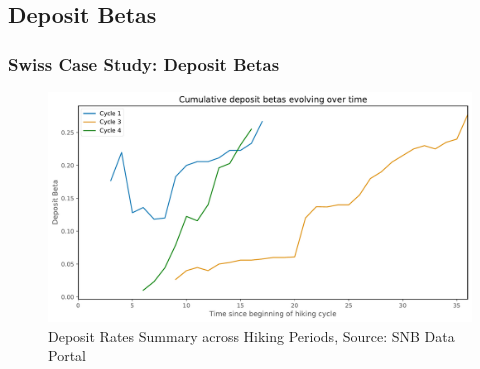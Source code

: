 \documentclass{beamer}
\begin{document}
\subsection{Deposit Betas}
\begin{frame}
\frametitle{Swiss Case Study: Deposit Betas}
\begin{center}
\begin{minipage}{1\textwidth}
\begin{figure}[H]
    \includegraphics[width=\textwidth]{../../figures/deposit_beta_SNB.pdf}
    \caption{Deposit Rates Summary across Hiking Periods, Source: SNB Data Portal \cite{snb2023}}
    \label{fig:deposit_betas}
\end{figure}
\end{minipage}
\end{center}
\end{frame}
\end{document}
